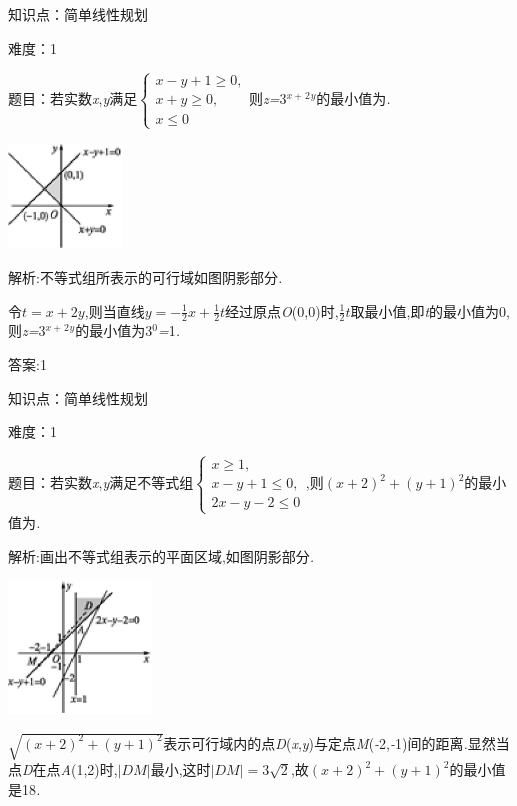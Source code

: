 \documentclass{article} %
\begin{document}
知识点：简单线性规划

难度：1

题目：若实数\textit{x},\textit{y}满足$
\begin{cases}
x-y+1\ge0,\\
x+y \ge 0,\\
x\le 0
\end{cases}$则\textit{z=}3\textit{${}^{x+}$}${}^{2}$\textit{${}^{y}$}的最小值为\textit{\underbar{　　　　　}.~}

 \includegraphics*[width=1.20in, height=1.11in, keepaspectratio=false]{image1610}

 解析:不等式组所表示的可行域如图阴影部分\textit{.}

令$t=x+2y$,则当直线$y=-\frac{1}{2}x+\frac{1}{2}t$经过原点\textit{O}(0,0)时,$\frac{1}{2}t$取最小值,即\textit{t}的最小值为0,则\textit{z=}3\textit{${}^{x+}$}${}^{2}$\textit{${}^{y}$}的最小值为3${}^{0}$\textit{=}1\textit{.}

 答案:1

知识点：简单线性规划

难度：1

题目：若实数\textit{x},\textit{y}满足不等式组$
\begin{cases}
x \ge 1,\\
x-y +1 \le 0,\\
2x-y-2\le 0
\end{cases}$,则${(x+2)}^2+{(y+1)}^2$的最小值为\textit{\underbar{　　　　　}.~}

 解析:画出不等式组表示的平面区域,如图阴影部分\textit{.}

 \includegraphics*[width=1.50in, height=1.39in, keepaspectratio=false]{image1616}

$\sqrt{{(x+2)}^2+{(y+1)}^2}$表示可行域内的点\textit{D}(\textit{x},\textit{y})与定点\textit{M}(\textit{-}2,\textit{-}1)间的距离\textit{.}显然当点\textit{D}在点\textit{A}(1,2)时,$|DM|$最小,这时$|DM|=3\sqrt{2}$,故${(x+2)}^2+{(y+1)}^2$的最小值是18\textit{.}
\end{document}
